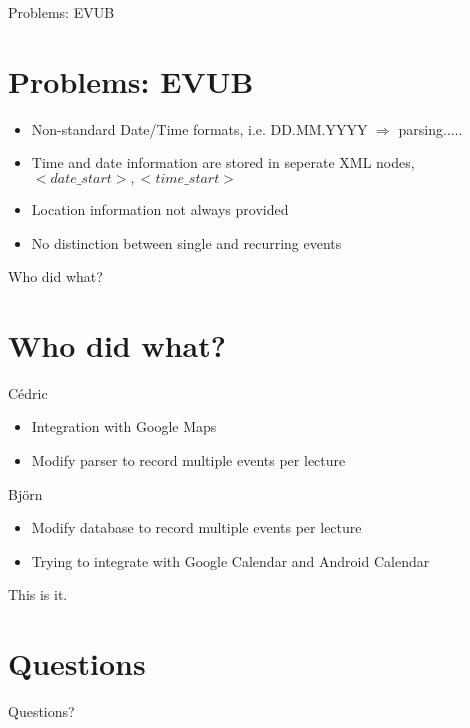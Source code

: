 \documentclass{beamer}
\begin{document}
\begin{frame}{Problems: EVUB}
	\section{Problems: EVUB}
	\begin{itemize}
		\item Non-standard Date/Time formats, i.e. DD.MM.YYYY $\Rightarrow$ parsing.....
		\item Time and date information are stored in seperate XML nodes, $<date\_start>, <time\_start>$
		\item Location information not always provided
		\item No distinction between single and recurring events
	\end{itemize}
\end{frame}

\begin{frame}{Who did what?}
	\section{Who did what?}
	Cédric
	\begin{itemize}
		\item Integration with Google Maps
		\item Modify parser to record multiple events per lecture
	\end{itemize}
	\bigskip
	Björn
	\begin{itemize}
		\item Modify database to record multiple events per lecture
		\item Trying to integrate with Google Calendar and Android Calendar
	\end{itemize}
\end{frame}
	
\begin{frame}{This is it.}
\section{Questions}
Questions?
\end{frame}
\end{document}
